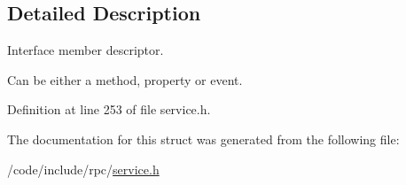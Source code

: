 \subsection{Detailed Description}
Interface member descriptor.

Can be either a method, property or event. 

Definition at line 253 of file service.\+h.



The documentation for this struct was generated from the following file\+:\begin{DoxyCompactItemize}
\item 
/code/include/rpc/\hyperlink{service_8h}{service.\+h}\end{DoxyCompactItemize}
